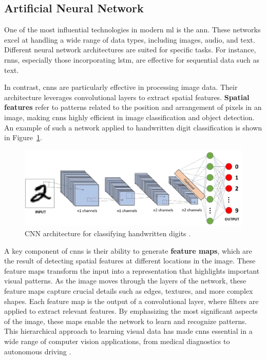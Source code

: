 \subsection{Artificial Neural Network}

One of the most influential technologies in modern \gls{ml} is the \gls{ann}. These networks excel at handling a wide range of data types, including images, audio, and text. Different neural network architectures are suited for specific tasks. For instance, \glspl{rnn}, especially those incorporating \gls{lstm}, are effective for sequential data such as text. \\

\newpage

In contrast, \glspl{cnn} are particularly effective in processing image data. Their architecture leverages convolutional layers to extract spatial features. \textbf{Spatial features} refer to patterns related to the position and arrangement of pixels in an image, making \glspl{cnn} highly efficient in image classification and object detection. An example of such a network applied to handwritten digit classification is shown in Figure~\ref{fig:convolutional-neural-network}.  \\

\begin{figure}[h!] \centering \includegraphics[width=0.75\linewidth]{figures/theory/machine-learning/convolutional-neural-network.png} \caption[CNN architecture for handwritten digit classification]{CNN architecture for classifying handwritten digits \cite{medium:cnn}.} \label{fig:convolutional-neural-network} \end{figure}

A key component of \glspl{cnn} is their ability to generate \textbf{feature maps}, which are the result of detecting spatial features at different locations in the image. These feature maps transform the input into a representation that highlights important visual patterns. As the image moves through the layers of the network, these feature maps capture crucial details such as edges, textures, and more complex shapes. Each feature map is the output of a convolutional layer, where filters are applied to extract relevant features. By emphasizing the most significant aspects of the image, these maps enable the network to learn and recognize patterns. This hierarchical approach to learning visual data has made \glspl{cnn} essential in a wide range of computer vision applications, from medical diagnostics to autonomous driving \cite{encord:cnn}. \\

